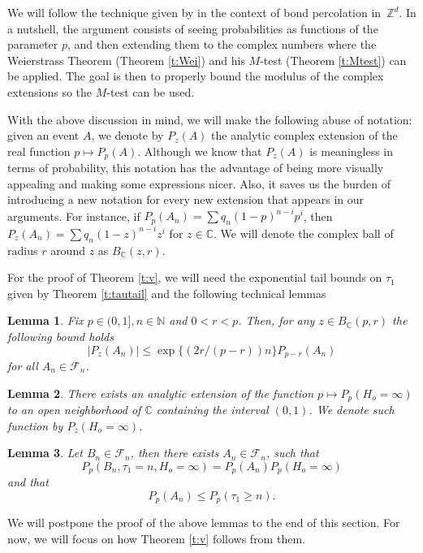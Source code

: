 \documentclass[a4paper]{amsart}
\newtheorem{lemma}{Lemma}
\begin{document}
We will follow the technique given by \cite{grego} in the context of bond percolation in~$\mathbb{Z}^d$. In a nutshell, the argument consists of seeing probabilities as functions of the parameter $p$, and then extending them to the complex numbers where the Weierstrass Theorem (Theorem \ref{t:Wei}) and his $M$-test (Theorem \ref{t:Mtest}) can be applied. The goal is then to properly bound the modulus of the complex extensions so the $M$-test can be used.

With the above discussion in mind, we will make the following abuse of notation: given an event $A$, we denote by $P_z(A)$ the analytic complex extension of the real function $p \mapsto P_p(A)$. Although we know that $P_z(A)$ is meaningless in terms of probability, this notation has the advantage of being more visually appealing and making some expressions nicer. Also, it saves us the burden of introducing a new notation for every new extension that appears in our arguments. For instance, if $P_p(A_n) = \sum q_n (1-p)^{n-i}p^i$, then $P_z(A_n) = \sum q_n(1-z)^{n-i}z^i$ for $z \in \mathbb{C}$. We will denote the complex ball of radius $r$ around $z$ as $B_{\mathbb{C}}(z,r)$.

For the proof of Theorem \ref{t:v}, we will need the exponential tail bounds on $\tau_1$ given by Theorem \ref{t:tautail} and the following technical lemmas
\begin{lemma}\label{l:An} Fix $p \in (0,1], n \in \mathbb{N}$ and $0<r<p$. Then, for any $z \in B_{\mathbb{C}}(p,r)$ the following bound holds
$$
|P_{z}(A_n)| \le \exp\{(2r/(p-r))n\}P_{p-r}(A_n)
$$
for all $A_n  \in \mathcal{F}_n$. 
\end{lemma}

\begin{lemma}\label{l:Ho} 
There exists an analytic extension of the function $p \mapsto P_p(H_o = \infty)$ to an open neighborhood of $\mathbb{C}$ containing the interval $(0, 1)$. We denote such function by $P_z(H_o = \infty)$.
\end{lemma}

\begin{lemma}\label{l:tau_analytics} Let $B_n \in \mathcal{F}_n$, then there exists $A_n \in \mathcal{F}_n$, such that
\begin{equation}\label{eq:fatorataun}
P_p(B_n, \tau_1 = n, H_o = \infty) = P_p(A_n)P_p(H_o = \infty)
\end{equation}
and that
\begin{equation}\label{eq:PAn_taun}
P_p(A_n) \le P_p(\tau_1 \ge n).
\end{equation}
\end{lemma}
We will postpone the proof of the above lemmas to the end of this section. For now, we will focus on how Theorem \ref{t:v} follows from them. 
\end{document}
